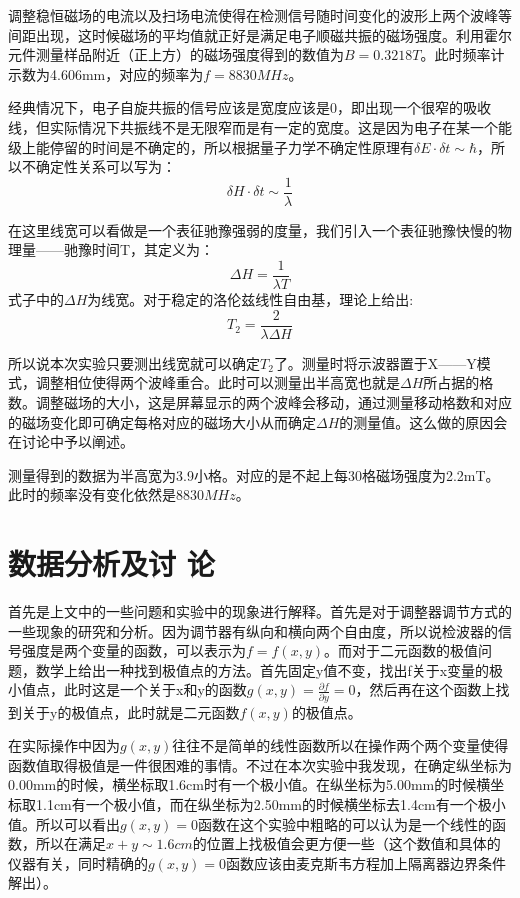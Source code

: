 \documentclass[aps,pre,12pt,preprint,onecolumn,showpacs,showkeys,UTF8]{revtex4-1}
\begin{document}
调整稳恒磁场的电流以及扫场电流使得在检测信号随时间变化的波形上两个波峰等间距出现，这时候磁场的平均值就正好是满足电子顺磁共振的磁场强度。利用霍尔元件测量样品附近（正上方）的磁场强度得到的数值为$B=0.3218T$。此时频率计示数为4.606mm，对应的频率为$f=8830MHz$。

经典情况下，电子自旋共振的信号应该是宽度应该是0，即出现一个很窄的吸收线，但实际情况下共振线不是无限窄而是有一定的宽度。这是因为电子在某一个能级上能停留的时间是不确定的，所以根据量子力学不确定性原理有$\delta E \cdot \delta t \sim \hbar$，所以不确定性关系可以写为：
\begin{equation}
	\delta H \cdot \delta t \sim \frac{1}{\lambda}
\end{equation}

在这里线宽可以看做是一个表征驰豫强弱的度量，我们引入一个表征驰豫快慢的物理量——驰豫时间T，其定义为：
$$\Delta H =\frac{1}{\lambda T}$$
式子中的$\Delta H$为线宽。对于稳定的洛伦兹线性自由基，理论上给出:
\begin{equation}
	T_2=\frac{2}{\lambda \Delta H}
\end{equation}

所以说本次实验只要测出线宽就可以确定$T_2$了。测量时将示波器置于X——Y模式，调整相位使得两个波峰重合。此时可以测量出半高宽也就是$\Delta H$所占据的格数。调整磁场的大小，这是屏幕显示的两个波峰会移动，通过测量移动格数和对应的磁场变化即可确定每格对应的磁场大小从而确定$\Delta H$的测量值。这么做的原因会在讨论中予以阐述。

测量得到的数据为半高宽为3.9小格。对应的是不起上每30格磁场强度为2.2mT。此时的频率没有变化依然是$8830MHz$。

\section{数据分析及讨 论}

首先是上文中的一些问题和实验中的现象进行解释。首先是对于调整器调节方式的一些现象的研究和分析。因为调节器有纵向和横向两个自由度，所以说检波器的信号强度是两个变量的函数，可以表示为$f=f(x,y)$。而对于二元函数的极值问题，数学上给出一种找到极值点的方法。首先固定y值不变，找出f关于x变量的极小值点，此时这是一个关于x和y的函数$g(x,y)=\frac{\partial f}{\partial y}=0$，然后再在这个函数上找到关于y的极值点，此时就是二元函数$f(x,y)$的极值点。

在实际操作中因为$g(x,y)$往往不是简单的线性函数所以在操作两个两个变量使得函数值取得极值是一件很困难的事情。不过在本次实验中我发现，在确定纵坐标为0.00mm的时候，横坐标取1.6cm时有一个极小值。在纵坐标为5.00mm的时候横坐标取1.1cm有一个极小值，而在纵坐标为2.50mm的时候横坐标去1.4cm有一个极小值。所以可以看出$g(x,y)=0$函数在这个实验中粗略的可以认为是一个线性的函数，所以在满足$x+y\sim 1.6cm$的位置上找极值会更方便一些（这个数值和具体的仪器有关，同时精确的$g(x,y)=0$函数应该由麦克斯韦方程加上隔离器边界条件解出）。
\end{document}
